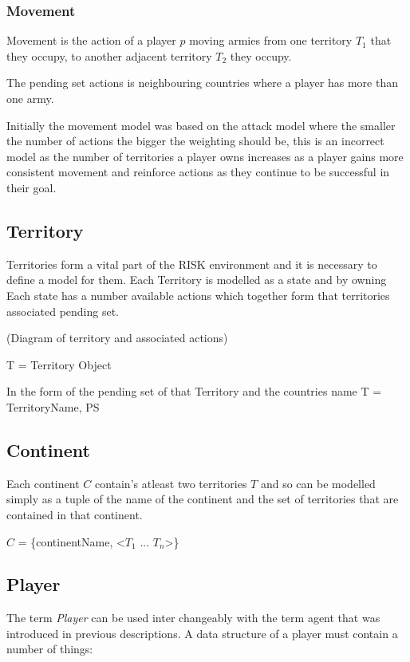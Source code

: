 \documentclass[parskip]{cs4rep}
\begin{document}
\subsubsection{Movement}

Movement is the action of a player $p$ moving armies from one territory $T_{1}$ that they occupy, to another adjacent territory $T_{2}$ they occupy.

The pending set actions is neighbouring countries where a player has more than one army.

Initially the movement model was based on the attack model where the smaller the number of actions the bigger the weighting should be, this is an incorrect model as the number of territories a player owns increases as a player gains more consistent movement and reinforce actions as they continue to be successful in their goal.

\subsection{Territory}

Territories form a vital part of the RISK environment and it is necessary to define a model for them. Each Territory is modelled as a state and by owning Each state has a number available actions which together form that territories associated pending set.

(Diagram of territory and associated actions)

T = Territory Object

In the form of the pending set of that Territory and the countries name T = { TerritoryName, PS }

\subsection{Continent}

Each continent $C$ contain's atleast two territories $T$ and so can be modelled simply as a tuple of the name of the continent and the set of territories that are contained in that continent.

$C$ = \{continentName, <$T_{1}$ ... $T_{n}$>\}

\subsection{Player}

The term \textit{Player} can be used inter changeably with the term agent that was introduced in previous descriptions. A data structure of a player must contain a number of things:
\end{document}
